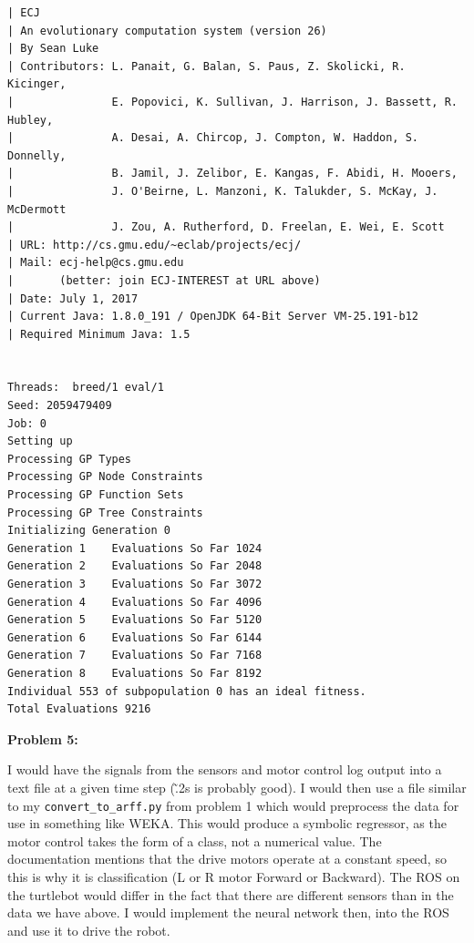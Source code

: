 \documentclass{amsart}
\theoremstyle{definition}
\begin{document}
\begin{verbatim}
| ECJ
| An evolutionary computation system (version 26)
| By Sean Luke
| Contributors: L. Panait, G. Balan, S. Paus, Z. Skolicki, R. Kicinger,
|               E. Popovici, K. Sullivan, J. Harrison, J. Bassett, R. Hubley,
|               A. Desai, A. Chircop, J. Compton, W. Haddon, S. Donnelly,
|               B. Jamil, J. Zelibor, E. Kangas, F. Abidi, H. Mooers,
|               J. O'Beirne, L. Manzoni, K. Talukder, S. McKay, J. McDermott
|               J. Zou, A. Rutherford, D. Freelan, E. Wei, E. Scott
| URL: http://cs.gmu.edu/~eclab/projects/ecj/
| Mail: ecj-help@cs.gmu.edu
|       (better: join ECJ-INTEREST at URL above)
| Date: July 1, 2017
| Current Java: 1.8.0_191 / OpenJDK 64-Bit Server VM-25.191-b12
| Required Minimum Java: 1.5


Threads:  breed/1 eval/1
Seed: 2059479409 
Job: 0
Setting up
Processing GP Types
Processing GP Node Constraints
Processing GP Function Sets
Processing GP Tree Constraints
Initializing Generation 0
Generation 1	Evaluations So Far 1024
Generation 2	Evaluations So Far 2048
Generation 3	Evaluations So Far 3072
Generation 4	Evaluations So Far 4096
Generation 5	Evaluations So Far 5120
Generation 6	Evaluations So Far 6144
Generation 7	Evaluations So Far 7168
Generation 8	Evaluations So Far 8192
Individual 553 of subpopulation 0 has an ideal fitness.
Total Evaluations 9216
\end{verbatim}


\bigbreak
\textbf{Problem 5:}
\bigbreak


I would have the signals from the sensors and motor control log output into a text file at a given time step (\~ .2s is probably good).
I would then use a file similar to my {\tt convert\_to\_arff.py} from problem 1 which would preprocess the data for use in something like WEKA.
This would produce a symbolic regressor, as the motor control takes the form of a class, not a numerical value.
The documentation mentions that the drive motors operate at a constant speed, so this is why it is classification (L or R motor Forward or Backward).
The ROS on the turtlebot would differ in the fact that there are different sensors than in the data we have above.
I would implement the neural network then, into the ROS and use it to drive the robot.


\end{document}
